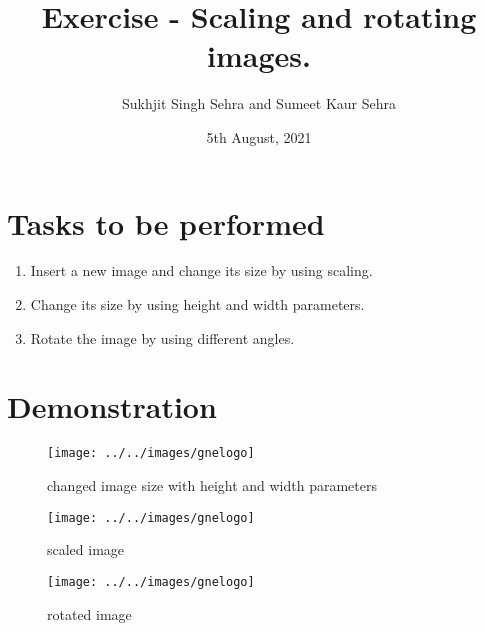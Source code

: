 \documentclass{article}
\title{Exercise  - Scaling and rotating images.}
\author{Sukhjit Singh Sehra and Sumeet Kaur Sehra}
\date{5th August, 2021}
\begin{document}
	\maketitle	
	\section*{Tasks to be performed}
	\begin{enumerate}	
		\item Insert a new image and change its size by using scaling.
		\item Change its size by using height and width parameters.
		\item Rotate the image by using different angles.
		
		\end{enumerate}
	\section*{Demonstration}
	
	\begin{figure}[t]
	\caption{changed image size with height and width parameters}
	\centering
	\texttt{[image: ../../images/gnelogo]}
	
	\label{fig:logo}
\end{figure}
		\begin{figure}
		\centering
		\texttt{[image: ../../images/gnelogo]}
		\caption{scaled image}
		\label{fig:logo}
		\end{figure}
	
		\begin{figure}
			\centering
			\texttt{[image: ../../images/gnelogo]}
			\caption{rotated image}
			\label{fig:logo}
			
		\end{figure}

	
\end{document}
